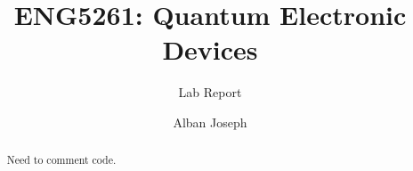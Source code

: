 \documentclass{report}
\title{ENG5261: Quantum Electronic Devices}
\author{Lab Report}
\date{Alban Joseph}
\begin{document}
\maketitle

\begin{abstract}
Need to comment code.
\end{abstract}







\appendix




\end{document}
